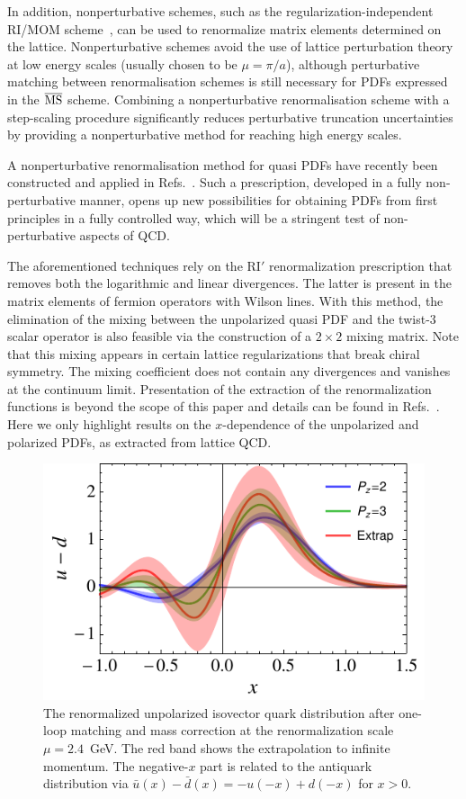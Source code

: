 \begin{itemize}
In addition, nonperturbative schemes, such as the regularization-independent RI/MOM scheme~\cite{Martinelli:1994ty}, can be used to renormalize matrix elements determined on the lattice. Nonperturbative schemes avoid the use of lattice perturbation theory at low energy scales (usually chosen to be $\mu = \pi/a$), although perturbative matching between renormalisation schemes is still necessary for PDFs expressed in the $\overline{\rm MS}$ scheme. Combining a nonperturbative renormalisation scheme with a step-scaling procedure \cite{Luscher:1991wu} significantly reduces perturbative truncation uncertainties by providing a nonperturbative method for reaching high energy scales. 

 A nonperturbative renormalisation method for quasi PDFs have recently been constructed and applied in 
Refs.~\cite{Alexandrou:2017huk,Chen:2017mzz}. Such a prescription, developed in a fully non-perturbative 
manner, opens up new possibilities for obtaining PDFs from first principles in a fully controlled way, 
which will be a stringent test of non-perturbative aspects of QCD. 

The aforementioned techniques rely on the RI$'$ renormalization prescription that removes both the 
logarithmic and linear divergences. The latter is present in the matrix elements of fermion operators with 
Wilson lines. With this method, the elimination of the mixing between the unpolarized quasi PDF and the 
twist-3 scalar operator is also feasible via the construction of a $2\times2$ mixing matrix. Note that 
this mixing appears in certain lattice regularizations that break chiral symmetry. The mixing coefficient 
does not contain any divergences and vanishes at the continuum limit. Presentation of the extraction of 
the renormalization functions is beyond the scope of this paper and details can be found in
Refs.~\cite{Alexandrou:2017huk,Chen:2017mzz}. Here we only highlight results on the $x$-dependence 
of the unpolarized and polarized PDFs, as extracted from lattice QCD. 

\begin{figure}[h]
\centering
\includegraphics[width=.6\textwidth]{plots/pdf_nonorm}
\caption{The renormalized unpolarized isovector quark distribution after one-loop matching and mass correction at the renormalization scale $\mu=2.4$~GeV. The red band shows the extrapolation to infinite momentum. The negative-$x$ part is related to the antiquark distribution via $\bar{u}(x)-\bar{d}(x) = - u(-x)+ d(-x)$ for $x>0$.
} \label{fig:final_pdf}
\end{figure}


\end{itemize}
